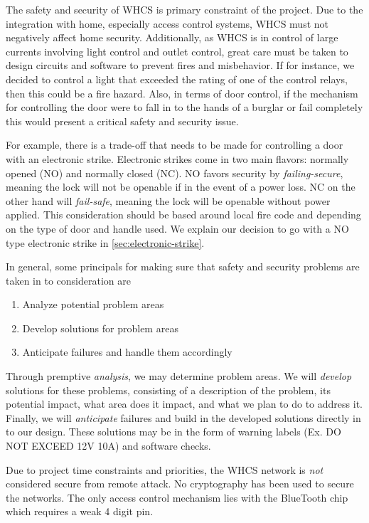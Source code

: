 The safety and security of WHCS is primary constraint of the project. Due to
the integration with home, especially access control systems, WHCS must not
negatively affect home security. Additionally, as WHCS is in control of large
currents involving light control and outlet control, great care must be taken
to design circuits and software to prevent fires and misbehavior. If for
instance, we decided to control a light that exceeded the rating of one of the
control relays, then this could be a fire hazard. Also, in terms of door
control, if the mechanism for controlling the door were to fall in to the hands
of a burglar or fail completely this would present a critical safety and
security issue.

For example, there is a trade-off that needs to be made for controlling a door
with an electronic strike. Electronic strikes come in two main flavors:
normally opened (NO) and normally closed (NC). NO favors security by
\emph{failing-secure}, meaning the lock will not be openable if in the event of
a power loss. NC on the other hand will \emph{fail-safe}, meaning the lock will
be openable without power applied. This consideration should be based around
local fire code and depending on the type of door and handle used. We explain
our decision to go with a NO type electronic strike in
\autoref{sec:electronic-strike}.

In general, some principals for making sure that safety and security problems
are taken in to consideration are

\begin{enumerate} \item Analyze potential problem areas \item Develop solutions
for problem areas \item Anticipate failures and handle them accordingly
\end{enumerate}

Through premptive \emph{analysis}, we may determine problem areas. We will
\emph{develop} solutions for these problems, consisting of a description of the
problem, its potential impact, what area does it impact, and what we plan to do
to address it. Finally, we will \emph{anticipate} failures and build in the
developed solutions directly in to our design. These solutions may be in the
form of warning labels (Ex. DO NOT EXCEED 12V 10A) and software checks.

Due to project time constraints and priorities, the WHCS network is \emph{not}
considered secure from remote attack. No cryptography has been used to secure
the networks. The only access control mechanism lies with the BlueTooth chip
which requires a weak 4 digit pin.

